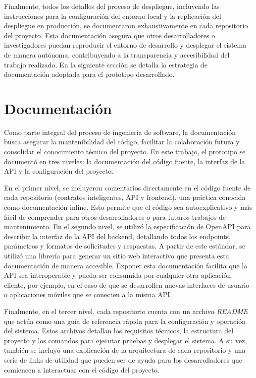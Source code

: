 Finalmente, todos los detalles del proceso de despliegue, incluyendo las instrucciones para la configuración del entorno local y la replicación del despliegue en producción, se documentaron exhaustivamente en cada repositorio del proyecto. Esta documentación asegura que otros desarrolladores o investigadores puedan reproducir el entorno de desarrollo y desplegar el sistema de manera autónoma, contribuyendo a la transparencia y accesibilidad del trabajo realizado. En la siguiente sección se detalla la estrategia de documentación adoptada para el prototipo desarrollado.

\section{Documentación}
\label{sec:documentation}

Como parte integral del proceso de ingeniería de software, la documentación busca asegurar la mantenibilidad del código, facilitar la colaboración futura y consolidar el conocimiento técnico del proyecto. En este trabajo, el prototipo se documentó en tres niveles: la documentación del código fuente, la interfaz de la API y la configuración del proyecto.

En el primer nivel, se incluyeron comentarios directamente en el código fuente de cada repositorio (contratos inteligentes, API y frontend), una práctica conocida como documentación inline. Esto permite que el código sea autoexplicativo y más fácil de comprender para otros desarrolladores o para futuros trabajos de mantenimiento. En el segundo nivel, se utilizó la especificación de OpenAPI para describir la interfaz de la API del backend, detallando todos los endpoints, parámetros y formatos de solicitudes y respuestas. A partir de este estándar, se utilizó una librería para generar un sitio web interactivo que presenta esta documentación de manera accesible. Exponer esta documentación facilita que la API sea interoperable y pueda ser consumida por cualquier otra aplicación cliente, por ejemplo, en el caso de que se desarrollen nuevas interfaces de usuario o aplicaciones móviles que se conecten a la misma API.

Finalmente, en el tercer nivel, cada repositorio cuenta con un archivo \textit{README} que actúa como una guía de referencia rápida para la configuración y operación del sistema. Estos archivos detallan los requisitos técnicos, la estructura del proyecto y los comandos para ejecutar pruebas y desplegar el sistema. A su vez, también se incluyó una explicación de la arquitectura de cada repositorio y una serie de links de utilidad que pueden ser de ayuda para los desarrolladores que comiencen a interactuar con el código del proyecto.

